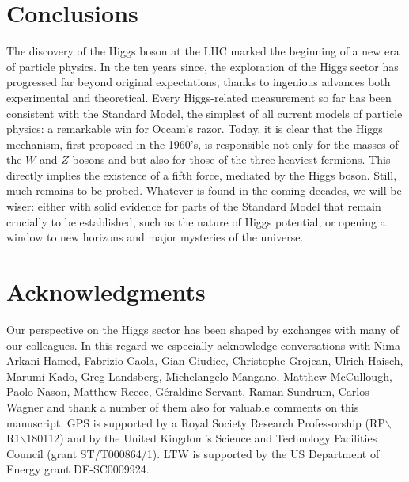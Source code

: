 \documentclass{article}
\begin{document}
\section*{Conclusions}

The discovery of the Higgs boson at the LHC marked the beginning of a
new era of particle physics.
%
In the ten years since, the exploration of the Higgs sector has
progressed far beyond original expectations, thanks to ingenious
advances both experimental and theoretical.
%
Every Higgs-related measurement so far has been consistent with the
Standard Model, the simplest of all current models of particle
physics: a remarkable win for Occam's razor. 
%
Today, it is clear that the Higgs mechanism, first proposed in the
1960's, is responsible not only for the masses of the $W$ and $Z$
bosons and but also for those of the three heaviest fermions.
%
This directly implies the existence of a fifth force, mediated by the
Higgs boson.
%
Still, much remains to be probed.
%
Whatever is found in the coming decades, we will be wiser: either with
solid evidence for parts of the Standard Model that remain crucially
to be established, such as the nature of Higgs potential, or opening a
window to new horizons and major mysteries of the universe.


\section*{Acknowledgments}

Our perspective on the Higgs sector has been shaped by exchanges
with many of our colleagues.
%
In this regard we especially acknowledge conversations with
%
Nima Arkani-Hamed,    
Fabrizio Caola,       
Gian Giudice,         
Christophe Grojean,   
Ulrich Haisch,        
Marumi Kado,
Greg Landsberg,       
Michelangelo Mangano, 
Matthew McCullough,   
Paolo Nason,          
Matthew Reece,        
G\'eraldine Servant,  
Raman Sundrum,        
Carlos Wagner         
%
and thank a number of them also for valuable comments on this
manuscript.
%
GPS is supported by a Royal Society Research Professorship
(RP$\backslash$R1$\backslash$180112) and by the United Kingdom's
Science and Technology Facilities Council (grant ST/T000864/1).
%
LTW is supported by the US Department of Energy grant DE-SC0009924.


{}

\end{document}
